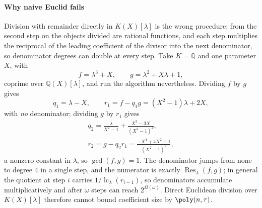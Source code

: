 \paragraph{Why naive Euclid fails}\label{appBC:sub:naive}
Division with remainder directly in $K(X)[\lambda]$ is the wrong procedure: from the second step on the
objects divided are rational functions, and each step multiplies the reciprocal of the leading
coefficient of the divisor into the next denominator, so denominator degrees can double at every step.
Take $K=\mathbb{Q}$ and one parameter $X$, with
\[
f=\lambda^{3}+X,\qquad g=\lambda^{2}+X\lambda+1 ,
\]
coprime over $\mathbb{Q}(X)[\lambda]$, and run the algorithm nevertheless. Dividing $f$ by $g$ gives
\[
q_1=\lambda-X,\qquad r_1=f-q_1g=(X^{2}-1)\lambda+2X ,
\]
with \emph{no} denominator; dividing $g$ by $r_1$ gives
\[
\begin{gathered}
q_2=\frac{\lambda}{X^{2}-1}+\frac{X^{3}-3X}{(X^{2}-1)^{2}},\\
r_2=g-q_2r_1=\frac{-X^{4}+4X^{2}+1}{(X^{2}-1)^{2}} ,
\end{gathered}
\]
a nonzero constant in $\lambda$, so $\gcd(f,g)=1$. The denominator jumps from none to degree $4$ in a
single step, and the numerator is exactly $\operatorname{Res}_\lambda(f,g)$; in general the quotient at
step $i$ carries $1/\operatorname{lc}_\lambda(r_{i-1})$, so denominators accumulate multiplicatively and
after $\omega$ steps can reach $2^{\Omega(\omega)}$. Direct Euclidean division over $K(X)[\lambda]$
therefore cannot bound coefficient size by $\poly(n,\tau)$.

